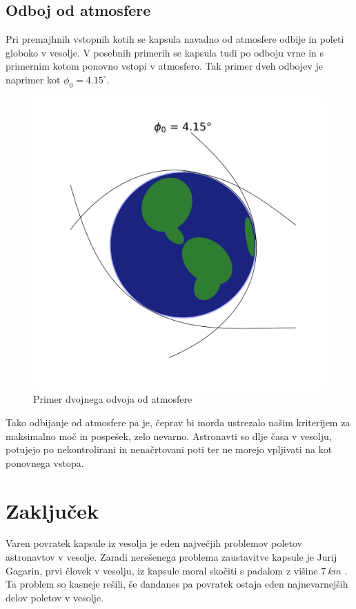 \documentclass[11pt,a4paper]{article}
\begin{document}
\subsection{Odboj od atmosfere}

Pri premajhnih vstopnih kotih se kapsula navadno od atmosfere odbije in poleti globoko v vesolje. V posebnih primerih se kapsula tudi po odboju vrne in s primernim kotom ponovno vstopi v atmosfero. Tak primer dveh odbojev je naprimer kot $ \phi_0 = 4.15^\circ $.

\begin{figure}[H]
	\begin{center}
		\includegraphics[width=12cm]{4_15_scheme.pdf}
		\caption{Primer dvojnega odvoja od atmosfere}
	\end{center}
\end{figure}

Tako odbijanje od atmosfere pa je, \v ceprav bi morda ustrezalo na\v sim kriterijem za maksimalno mo\v c in pospe\v sek, zelo nevarno. Astronavti so dlje \v casa v vesolju, potujejo po nekontrolirani in nena\v crtovani poti ter ne morejo vpljivati na kot ponovnega vstopa.
\clearpage

\section{Zaklju\v cek}
Varen povratek kapsule iz vesolja je eden najve\v cjih problemov poletov astronavtov v vesolje. Zaradi nere\v senega problema zaustavitve kapsule je Jurij Gagarin, prvi \v clovek v vesolju, iz kapsule moral sko\v citi s padalom z vi\v sine $ 7\ km $ \cite{vostok-1-wiki}. Ta problem so kasneje re\v sili, \v se dandanes pa povratek ostaja eden najnevarnej\v sih delov poletov v vesolje.
\end{document}

